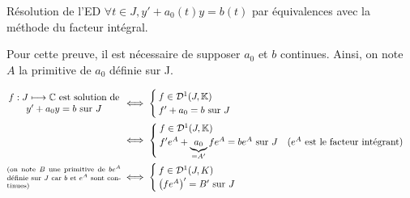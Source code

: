 \documentclass{article}
\renewenvironment{question_kholle}[2][ ]
{
	\subsection{\texorpdfstring{#2}{}}
	\notblank{#1}
	{
		\noindent #1
		\bigbreak
	}
	{}
	\begin{proof}
}
{
	\end{proof}
}
\begin{document}
\begin{question_kholle}{Résolution de l'ED  $\forall t \in J, y' + a_{0}(t)y = b(t)$ par équivalences avec la méthode du facteur intégral.}

	Pour cette preuve, il est nécessaire de supposer $a_{0}$ et $b$ continues.
	Ainsi, on note $A$ la primitive de $a_{0}$ définie sur J.

	\begin{align*}
		\parbox{12em}{\centering$f:J\longmapsto\C$ est solution de $y'+a_{0}y=b$ sur $J$}                                     & \iff \begin{cases}
			                                                                                                                             f \in \mathcal{D}^1(J,\K) \\
			                                                                                                                             f'+ a_0 = b \text{ sur } J
		                                                                                                                             \end{cases}                                                                                                                                         \\
		                                                                                                                      & \iff \begin{cases}
			                                                                                                                             f\in\mathcal{D}^1(J,\K) \\
			                                                                                                                             f' e^{A} + \underbrace{a_{0}}_{=A'}f e^{A} = b e^{A} \text{ sur } J \quad\text{($e^{A}$ est le facteur intégrant)}
		                                                                                                                             \end{cases} \\
		\parbox{12em}{\scriptsize (on note $B$ une primitive de $b e^{A}$ définie sur $J$ car $b$ et $e^{A}$ sont continues)} & \iff \begin{cases}
			                                                                                                                             f\in\mathcal{D}^1(J,K) \\
			                                                                                                                             \left(f e^{A}\right)' = B' \text{ sur } J

\end{cases}
\end{align*}
\end{question_kholle}
\end{document}
